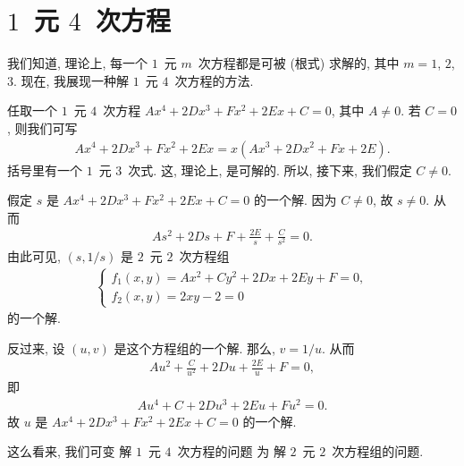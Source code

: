 \documentclass[%
    UTF8,%
    fontset=none,%
    punct=kaiming,%
    zihao=-4,%
    a4paper,%
    oneside,%
]{ctexbook}
\begin{document}
\section{\texorpdfstring{\(1\)~元 \(4\)~次方程}%
  {1 元 4 次方程}}

我们知道, 理论上,
每一个 \(1\)~元 \(m\)~次方程都是可被 (根式) 求解的,
其中 \(m = 1\), \(2\), \(3\).
现在, 我展现一种解 \(1\)~元 \(4\)~次方程的方法.

任取一个 \(1\)~元 \(4\)~次方程
\(Ax^4 + 2Dx^3 + Fx^2 + 2Ex + C = 0\),
其中 \(A \neq 0\).
若 \(C = 0\), 则我们可写
\begin{align*}
    Ax^4 + 2Dx^3 + Fx^2 + 2Ex = x(Ax^3 + 2Dx^2 + Fx + 2E).
\end{align*}
括号里有一个 \(1\)~元 \(3\)~次式.
这, 理论上, 是可解的.
所以, 接下来, 我们假定 \(C \neq 0\).

假定 \(s\) 是
\(Ax^4 + 2Dx^3 + Fx^2 + 2Ex + C = 0\)
的一个解.
因为 \(C \neq 0\), 故 \(s \neq 0\).
从而
\begin{align*}
    As^2 + 2Ds + F + \frac{2E}{s} + \frac{C}{s^2} = 0.
\end{align*}
由此可见, \((s, 1/s)\) 是 \(2\)~元 \(2\)~次方程组
\begin{align}
    \begin{cases}
        f_1 (x, y) = Ax^2 + Cy^2 + 2Dx + 2Ey + F = 0, \\
        f_2 (x, y) = 2xy - 2 = 0
    \end{cases}
    \label{eq:A0401}
\end{align}
的一个解.

反过来, 设 \((u, v)\) 是这个方程组的一个解.
那么, \(v = 1/u\).
从而
\begin{align*}
    Au^2 + \frac{C}{u^2} + 2Du + \frac{2E}{u} + F = 0,
\end{align*}
即
\begin{align*}
    Au^4 + C + 2Du^3 + 2Eu + Fu^2 = 0.
\end{align*}
故 \(u\) 是
\(Ax^4 + 2Dx^3 + Fx^2 + 2Ex + C = 0\)
的一个解.

这么看来, 我们可变%
解 \(1\)~元 \(4\)~次方程的问题%
为%
解 \(2\)~元 \(2\)~次方程组的问题.
\end{document}
